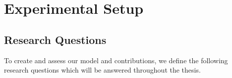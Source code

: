 \chapter{Experimental Setup}
\label{ExperimentalSetup}


\section{Research Questions}
To create and assess our model and contributions, we define the following research questions which will be answered throughout the thesis.

